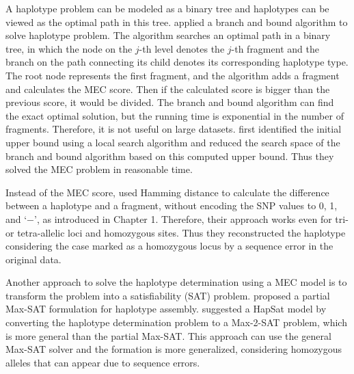 A haplotype problem can be modeled as a binary tree and haplotypes can be viewed as the optimal path in this tree. 
\cite{wang2005haplotype} applied a branch
and bound algorithm to solve haplotype problem. 
The algorithm searches an optimal path in a binary tree, in which
the node on the $j$-th level denotes the $j$-th fragment and the
branch on the path connecting its child denotes its
corresponding haplotype type. 
The root node represents the first fragment, and the
algorithm adds a fragment and calculates the MEC score. 
Then if the calculated score is bigger than the previous score, it would be divided. 
The branch and bound algorithm
can find the exact optimal solution, but the running time is exponential in the number of
fragments. Therefore, it is not useful on large datasets. 
\cite{lim2012individual} first identified the initial upper bound using a local search algorithm and 
reduced the search space of the branch and bound algorithm based on this computed upper bound.
Thus they solved the MEC problem in reasonable time.

Instead of the MEC score, \cite{wang2012using} used Hamming distance to calculate the difference between a haplotype and a fragment, 
without encoding the SNP values to 0, 1, and ‘−’, as introduced in Chapter 1. 
Therefore, their  approach works even for tri- or tetra-allelic loci and homozygous sites. 
Thus they reconstructed the haplotype considering the case marked as a homozygous locus by a sequence error in the original data. 

Another approach to solve the haplotype determination using a MEC model is to transform the problem into a satisfiability (SAT) problem. 
\cite{he2010optimal} proposed a partial Max-SAT formulation for haplotype assembly. 
\cite{mousavi2011effective} suggested a HapSat model by converting the haplotype determination problem to a Max-2-SAT problem,
which is more general than the partial Max-SAT. 
This approach can use the general Max-SAT solver and the formation is more generalized, 
considering homozygous alleles that can appear due to sequence errors.

